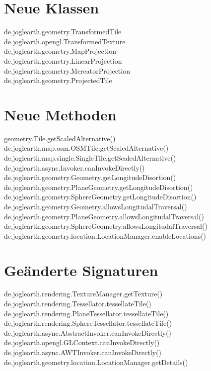 \documentclass[10pt]{scrreprt}
\begin{document}
\section{Neue Klassen}
de.joglearth.geometry.TransformedTile\\
de.joglearth.opengl.TransformedTexture\\
de.joglearth.geometry.MapProjection\\
de.joglearth.geometry.LinearProjection\\
de.joglearth.geometry.MercatorProjection\\
de.joglearth.geometry.ProjectedTile\\
\section{Neue Methoden}
geometry.Tile.getScaledAlternative()\\
de.joglearth.map.osm.OSMTile.getScaledAlternative()\\
de.joglearth.map.single.SingleTile.getScaledAlternative()\\
de.joglearth.async.Invoker.canInvokeDirectly()\\
de.joglearth.geometry.Geometry.getLongitudeDisortion()\\
de.joglearth.geometry.PlaneGeometry.getLongitudeDisortion()\\
de.joglearth.geometry.SphereGeometry.getLongitudeDisortion()\\
de.joglearth.geometry.Geometry.allowsLongitudalTraversal()\\
de.joglearth.geometry.PlaneGeometry.allowsLongitudalTraversal()\\
de.joglearth.geometry.SphereGeometry.allowsLongitudalTraversal()\\
de.joglearth.geometry.location.LocationManager.enableLocations()\\
\section{Geänderte Signaturen}
de.joglearth.rendering.TextureManager.getTexture()\\
de.joglearth.rendering.Tessellator.tessellateTile()\\
de.joglearth.rendering.PlaneTessellator.tessellateTile()\\
de.joglearth.rendering.SphereTessellator.tessellateTile()\\
de.joglearth.async.AbstractInvoker.canInvokeDirectly()\\
de.joglearth.opengl.GLContext.canInvokeDirectly()\\
de.joglearth.async.AWTInvoker.canInvokeDirectly()\\
de.joglearth.geometry.location.LocationManager.getDetails()\\
\end{document}
